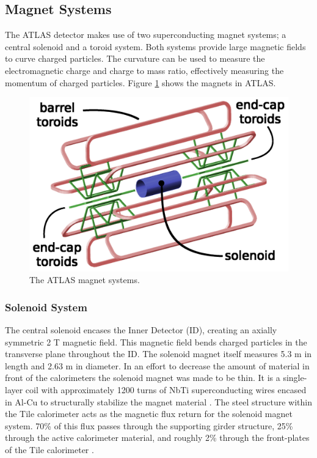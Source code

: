 	\subsection{Magnet Systems}\label{ssec:magnets}
	The ATLAS detector makes use of two superconducting magnet systems; a central solenoid and a toroid system. Both systems provide large magnetic fields to curve charged particles. The curvature can be used to measure the electromagnetic charge and charge to mass ratio, effectively measuring the momentum of charged particles. Figure \ref{fig:ATLAS-magnets} shows the magnets in ATLAS.

	\begin{figure}[!ht]
	\centering
	\includegraphics[width=.65\textwidth,keepaspectratio=true]{chapters/chapter2_experiment/images/magnetSystems.png}
	\caption{ The ATLAS magnet systems.}
	\label{fig:ATLAS-magnets}
	\end{figure}

	\subsubsection{Solenoid System}\label{sssec:solenoid}
	The central solenoid encases the Inner Detector (ID), creating an axially symmetric 2 T magnetic field. This magnetic field bends charged particles in the transverse plane throughout the ID. The solenoid magnet itself measures 5.3 m in length and 2.63 m in diameter. In an effort to decrease the amount of material in front of the calorimeters the solenoid magnet was made to be thin. It is a single-layer coil with approximately 1200 turns of NbTi superconducting wires encased in Al-Cu to structurally stabilize the magnet material \cite{atlas-solenoid}. The steel structure within the Tile calorimeter acts as the magnetic flux return for the solenoid magnet system. 70\% of this flux passes through the supporting girder structure, 25\% through the active calorimeter material, and roughly 2\% through the front-plates of the Tile calorimeter \cite{ATLAS-tile}.

